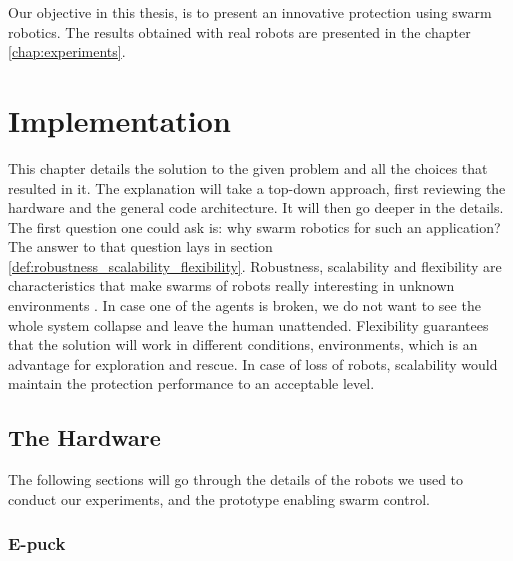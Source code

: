 \documentclass[oneside, a4paper, 12pt]{memoir}
\begin{document}
Our objective in this thesis, is to present an innovative protection using swarm robotics. The results obtained with real robots are presented in the chapter \ref{chap:experiments}.

\chapter{Implementation}

	This chapter details the solution to the given problem and all the choices that resulted in it. The explanation will take a top-down approach, first reviewing the hardware and the general code architecture. It will then go deeper in the details.\\
	
	The first question one could ask is: why swarm robotics for such an application? The answer to that question lays in section \ref{def:robustness_scalability_flexibility}. Robustness, scalability and flexibility are characteristics that make swarms of robots really interesting in unknown environments \citep{brambilla2013swarm}. In case one of the agents is broken, we do not want to see the whole system collapse and leave the human unattended. Flexibility guarantees that the solution will work in different conditions, environments, which is an advantage for exploration and rescue. In case of loss of robots, scalability would maintain the protection performance to an acceptable level.
	
	\section{The Hardware}
	
	The following sections will go through the details of the robots we used to conduct our experiments, and the prototype enabling swarm control.
	
		\subsection{E-puck}
		\label{sec:e-puck}
		
\end{document}
